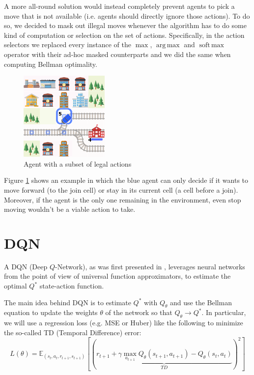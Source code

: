 \documentclass[a4paper,10pt]{report}
\DeclareMathOperator*{\argmax}{arg\,max}
\DeclareMathOperator*{\softmax}{soft\,max}
\begin{document}
A more all-round solution would instead completely prevent agents to pick a move that is not available (i.e. agents should directly ignore those actions). To do so, we decided to mask out illegal moves whenever the algorithm has to do some kind of computation or selection on the set of actions. Specifically, in the action selectors we replaced every instance of the $\max$, $\argmax$ and $\softmax$ operator with their ad-hoc masked counterparts and we did the same when computing Bellman optimality.

\begin{figure}[h]
	\center
	\includegraphics[width=0.4\linewidth]{legal-actions.png}
	\caption{Agent with a subset of legal actions}
	\label{fig:legal-actions}
\end{figure}

Figure \ref{fig:legal-actions} shows an example in which the blue agent can only decide if it wants to move forward (to the join cell) or stay in its current cell (a cell before a join). Moreover, if the agent is the only one remaining in the environment, even stop moving wouldn't be a viable action to take. 

\chapter{DQN}
A DQN (Deep $Q$-Network), as was first presented in \cite{atari-dqn}, leverages neural networks from the point of view of universal function approximators, to estimate the optimal $Q^*$ state-action function. 

The main idea behind DQN is to estimate $Q^*$ with $Q_\theta$ and use the Bellman equation to update the weights $\theta$ of the network so that $Q_\theta\rightarrow Q^*$. In particular, we will use a regression loss (e.g. MSE or Huber) like the following to minimize the so-called TD (Temporal Difference) error:
$$
L(\theta)=\mathbb{E}_{(s_t,a_t,r_{t+1},s_{t+1})}\left[\left(\underbrace{r_{t+1}+\gamma\max_{a_{t+1}}Q_\theta(s_{t+1}, a_{t+1}) - Q_\theta(s_t, a_t)}_{TD}\right)^2\right]
$$
\end{document}
